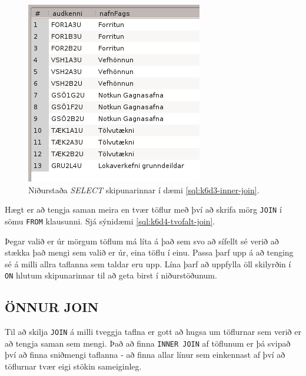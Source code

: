 \begin{figure}
\caption[INNER JOIN niðurstaða]{Niðurstaða \emph{SELECT} skipunarinnar í dæmi \ref{sql:k6d3-inner-join}. }
\label{mynd:nidurstada-join}
\centering
\includegraphics{myndir/workbench-nidurstada-join}
\end{figure}

Hægt er að tengja saman meira en tvær töflur með því að skrifa mörg \verb|JOIN| í sömu \verb|FROM| klausunni. Sjá sýnidæmi \ref{sql:k6d4-tvofalt-join}.

Þegar valið er úr mörgum töflum má líta á það sem svo að sífellt sé verið að stækka það mengi sem valið er úr, eina töflu í einu. Passa þarf upp á að tenging sé á milli allra taflanna sem taldar eru upp. Lína þarf að uppfylla öll skilyrðin í \verb|ON| hlutum skipunarinnar til að geta birst í niðurstöðunum.

\begin{example}
\caption[INNER JOIN]{\emph{SELECT} skipun sem velur nöfn hópa, hvaða áföngum hóparnir tilheyra og hver kennir þá, úr töflunum \emph{Hopar}, \emph{Afangar} og \emph{Starfsmenn}.}
\label{sql:k6d4-tvofalt-join}
\centering
{}
\end{example}

\subsection{ÖNNUR JOIN}
Til að skilja \verb|JOIN| á milli tveggja taflna er gott að hugsa um töflurnar sem verið er að tengja saman sem mengi. Það að finna \verb|INNER JOIN| af töflunum er þá svipað því að finna sniðmengi taflanna - að finna allar línur sem einkennast af því að töflurnar tvær eigi stökin sameiginleg.

